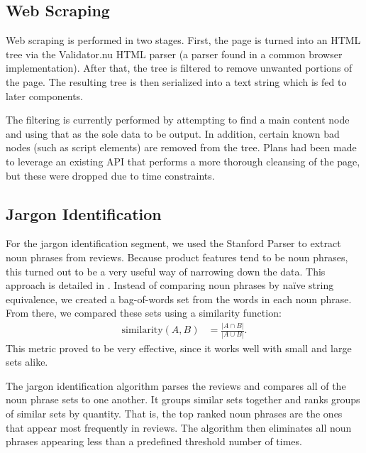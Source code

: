 \documentclass{article}
\begin{document}
\subsection{Web Scraping} %

Web scraping is performed in two stages. First, the page is turned into an HTML
tree via the Validator.nu HTML parser (a parser found in a common browser
implementation). After that, the tree is filtered to remove unwanted portions
of the page. The resulting tree is then serialized into a text string which is
fed to later components.

The filtering is currently performed by attempting to find a main content node
and using that as the sole data to be output. In addition, certain known bad
nodes (such as script elements) are removed from the tree. Plans had been made
to leverage an existing API that performs a more thorough cleansing of the page,
but these were dropped due to time constraints.



\subsection{Jargon Identification} %

For the jargon identification segment, we used the Stanford Parser to extract noun phrases from reviews.  Because product features tend to be noun phrases, this turned out to be a very useful way of narrowing down the data.  This approach is detailed in \cite{opine}.  Instead of comparing noun phrases by na\"ive string equivalence, we created a bag-of-words set from the words in each noun phrase.  From there, we compared these sets using a similarity function:\begin{align*}
	\text{similarity}(A,B) &= \frac{|A\cap B|}{|A\cup B|}.
\end{align*}  This metric proved to be very effective, since it works well with small and large sets alike.

The jargon identification algorithm parses the reviews and compares all of the noun phrase sets to one another.  It groups similar sets together and ranks groups of similar sets by quantity.  That is, the top ranked noun phrases are the ones that appear most frequently in reviews.  The algorithm then eliminates all noun phrases appearing less than a predefined threshold number of times.
\end{document}
